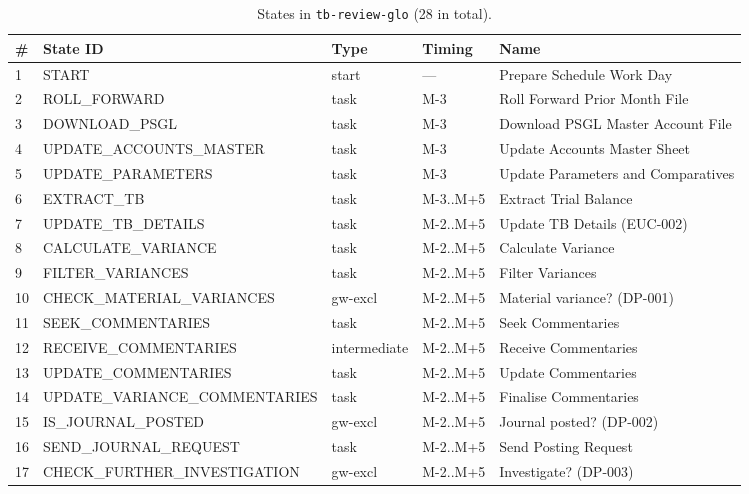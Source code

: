 \begin{table}[htbp]
\caption{States in \texttt{tb-review-glo} (28 in total).}\label{tab:states}
\centering
\footnotesize
\begin{tabularx}{\linewidth}{@{}llllX@{}}
\toprule
\textbf{\#} & \textbf{State ID} & \textbf{Type} & \textbf{Timing} & \textbf{Name} \\ \midrule
1  & START                         & start        & ---        & Prepare Schedule Work Day \\
2  & ROLL\_FORWARD                 & task         & M-3        & Roll Forward Prior Month File \\
3  & DOWNLOAD\_PSGL                & task         & M-3        & Download PSGL Master Account File \\
4  & UPDATE\_ACCOUNTS\_MASTER      & task         & M-3        & Update Accounts Master Sheet \\
5  & UPDATE\_PARAMETERS            & task         & M-3        & Update Parameters and Comparatives \\
6  & EXTRACT\_TB                   & task         & M-3..M+5   & Extract Trial Balance \\
7  & UPDATE\_TB\_DETAILS           & task         & M-2..M+5   & Update TB Details (EUC-002) \\
8  & CALCULATE\_VARIANCE           & task         & M-2..M+5   & Calculate Variance \\
9  & FILTER\_VARIANCES             & task         & M-2..M+5   & Filter Variances \\
10 & CHECK\_MATERIAL\_VARIANCES    & gw-excl      & M-2..M+5   & Material variance? (DP-001) \\
11 & SEEK\_COMMENTARIES            & task         & M-2..M+5   & Seek Commentaries \\
12 & RECEIVE\_COMMENTARIES         & intermediate & M-2..M+5   & Receive Commentaries \\
13 & UPDATE\_COMMENTARIES          & task         & M-2..M+5   & Update Commentaries \\
14 & UPDATE\_VARIANCE\_COMMENTARIES & task        & M-2..M+5   & Finalise Commentaries \\
15 & IS\_JOURNAL\_POSTED           & gw-excl      & M-2..M+5   & Journal posted? (DP-002) \\
16 & SEND\_JOURNAL\_REQUEST        & task         & M-2..M+5   & Send Posting Request \\
17 & CHECK\_FURTHER\_INVESTIGATION & gw-excl      & M-2..M+5   & Investigate? (DP-003) \\

\end{tabularx}
\end{table}
